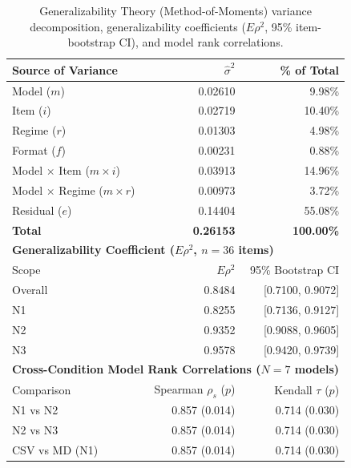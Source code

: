 \begin{table}[htbp]
\centering
\caption{Generalizability Theory (Method-of-Moments) variance decomposition, generalizability coefficients ($E\rho^2$, 95\% item-bootstrap CI), and model rank correlations.}
\label{tab:gtheory_variance}
\begin{tabular}{lrr}
\toprule
Source of Variance & $\hat{\sigma}^2$ & \% of Total \\
\midrule
Model ($m$) & 0.02610 & 9.98\% \\
Item ($i$) & 0.02719 & 10.40\% \\
Regime ($r$) & 0.01303 & 4.98\% \\
Format ($f$) & 0.00231 & 0.88\% \\
Model $\times$ Item ($m \times i$) & 0.03913 & 14.96\% \\
Model $\times$ Regime ($m \times r$) & 0.00973 & 3.72\% \\
Residual ($e$) & 0.14404 & 55.08\% \\
\midrule
\textbf{Total} & \textbf{0.26153} & \textbf{100.00\%} \\
\midrule
\multicolumn{3}{l}{\textbf{Generalizability Coefficient ($E\rho^2$, $n=36$ items)}} \\
Scope & $E\rho^2$ & 95\% Bootstrap CI \\
\midrule
Overall & 0.8484 & [0.7100, 0.9072] \\
N1 & 0.8255 & [0.7136, 0.9127] \\
N2 & 0.9352 & [0.9088, 0.9605] \\
N3 & 0.9578 & [0.9420, 0.9739] \\
\midrule
\multicolumn{3}{l}{\textbf{Cross-Condition Model Rank Correlations ($N=7$ models)}} \\
Comparison & Spearman $\rho_s$ ($p$) & Kendall $\tau$ ($p$) \\
\midrule
N1 vs N2 & 0.857 (0.014) & 0.714 (0.030) \\
N2 vs N3 & 0.857 (0.014) & 0.714 (0.030) \\
CSV vs MD (N1) & 0.857 (0.014) & 0.714 (0.030) \\
\bottomrule
\end{tabular}
\end{table}

